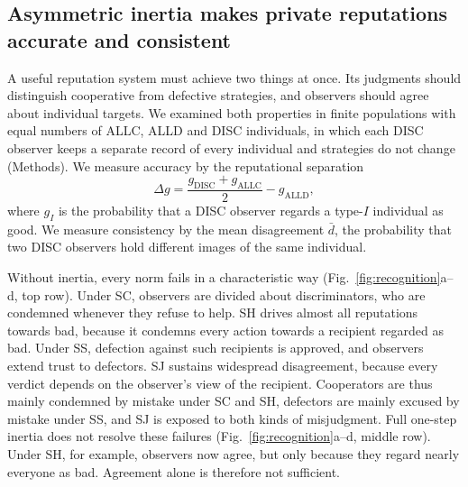 \documentclass[10pt]{wlscirep}
\newcommand{\ALLC}{\mathrm{ALLC}}
\newcommand{\ALLD}{\mathrm{ALLD}}
\newcommand{\DISC}{\mathrm{DISC}}
\theoremstyle{plain}
\theoremstyle{remark}
\begin{document}
\subsection*{Asymmetric inertia makes private reputations accurate and consistent}

A useful reputation system must achieve two things at once. Its judgments should distinguish cooperative from defective strategies, and observers should agree about individual targets. We examined both properties in finite populations with equal numbers of ALLC, ALLD and DISC individuals, in which each DISC observer keeps a separate record of every individual and strategies do not change (Methods). We measure accuracy by the reputational separation
\begin{equation}
\Delta g=\frac{g_{\DISC}+g_{\ALLC}}{2}-g_{\ALLD},
\label{eq:separation}
\end{equation}
where $g_I$ is the probability that a DISC observer regards a type-$I$ individual as good. We measure consistency by the mean disagreement $\bar d$, the probability that two DISC observers hold different images of the same individual.

Without inertia, every norm fails in a characteristic way (Fig.~\ref{fig:recognition}a--d, top row). Under SC, observers are divided about discriminators, who are condemned whenever they refuse to help. SH drives almost all reputations towards bad, because it condemns every action towards a recipient regarded as bad. Under SS, defection against such recipients is approved, and observers extend trust to defectors. SJ sustains widespread disagreement, because every verdict depends on the observer's view of the recipient. Cooperators are thus mainly condemned by mistake under SC and SH, defectors are mainly excused by mistake under SS, and SJ is exposed to both kinds of misjudgment. Full one-step inertia does not resolve these failures (Fig.~\ref{fig:recognition}a--d, middle row). Under SH, for example, observers now agree, but only because they regard nearly everyone as bad. Agreement alone is therefore not sufficient.
\end{document}
